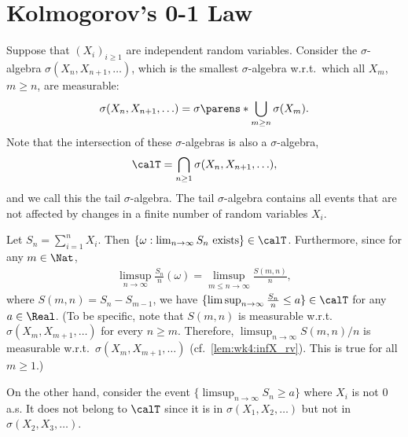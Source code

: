 \documentclass[../aipt.tex]{subfiles}
\begin{document}
\section{Kolmogorov's 0-1 Law}

Suppose that $(X_i)_{i\geq 1} $ are independent random variables. Consider the $\sigma$-algebra $\sigma(X_n,X_{n+1},\ldots)$, which is the smallest $\sigma$-algebra w.r.t.\ which all $X_m$, $m\geq n$, are measurable: 
\begin{align*}
\sigma(X_n,X_{n+1},\ldots) = \sigma\parens*{\bigcup_{m\geq n} \sigma(X_m)}.
\end{align*}
Note that the intersection of these $\sigma$-algebras is also a $\sigma$-algebra, 
\begin{align*}
\calT=\bigcap_{n\geq 1}\sigma(X_n,X_{n+1},\ldots),
\end{align*}
and we call this the tail $\sigma$-algebra. The tail $\sigma$-algebra contains all events that are not affected by changes in a finite number of random variables $X_i$.

Let $S_n= \sum_{i=1}^n X_i$. Then $\{\omega: \lim_{n \to \infty} S_n \text{ exists}\}\in\calT$. Furthermore, since for any $m\in\Nat$, 
\begin{align*}
\limsup_{n\to\infty} \frac{S_n}{n}(\omega) = \limsup_{m \leq n\to\infty} \frac{S(m,n)}{n},
\end{align*}
where $S(m,n) = S_n - S_{m-1}$, we have $\{\limsup_{n\to\infty} \frac{S_n}{n}\leq a\}\in\calT$ for any $a\in\Real$. (To be specific, note that $S(m,n)$ is measurable w.r.t.\ $\sigma(X_m, X_{m+1},\ldots)$ for every $n \geq m$. Therefore, $\limsup_{n\to\infty}S(m,n)/n$ is measurable w.r.t.\ $\sigma(X_m, X_{m+1},\ldots)$ (cf.\ \cref{lem:wk4:infX_rv}). This is true for all $m\geq1$.)

On the other hand, consider the event $\{\limsup_{n\to\infty} S_n\geq a\}$ where $X_i$ is not 0 a.s. It does not belong to $\calT$ since it is in $\sigma(X_1,X_2,\ldots)$ but not in $\sigma(X_2,X_3,\ldots)$.
\end{document}
